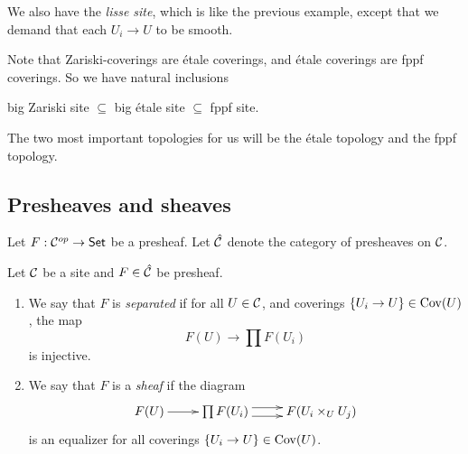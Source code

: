 \documentclass[11pt, english]{article}
\begin{document}
\begin{example}
We also have the \emph{lisse site}, which is like the previous example, except that we demand that each $U_i \to U$ to be smooth.
\end{example}

Note that Zariski-coverings are étale coverings, and étale coverings are fppf coverings. So we have natural inclusions
\begin{center}
big Zariski site $\subseteq$ big étale site $\subseteq$ fppf site.
\end{center}

The two most important topologies for us will be the étale topology and the fppf topology. 

\subsection{Presheaves and sheaves}

Let $F:\mathcal{C}^{op} \to \mathsf{Set}$ be a presheaf. Let $\hat {\mathcal{C}}$ denote the category of presheaves on $\mathcal{C}$.

\begin{defi}[Sheaf]
\label{def:sheaf}
Let $\mathcal{C}$ be a site and $F \in \hat {\mathcal{C}}$ be presheaf. 
\begin{enumerate}
\item We say that $F$ is \emph{separated} if for all $U \in \mathcal{C}$, and coverings $\{ U_i \to U\} \in \operatorname{Cov}(U)$, the map
\[
F(U) \to \prod F(U_i)
\]
is injective.
\item
We say that $F$ is a \emph{sheaf} if the diagram
\[
\xymatrix{
F(U) \ar[r] & \prod F(U_i) \ar@<0.8ex>[r] \ar@<-0.8ex>[r] & F(U_i \times_U U_j)
}
\]
is an equalizer for all coverings $\{ U_i \to U\} \in \operatorname{Cov}(U)$.
\end{enumerate}
\end{defi}
\end{document}
